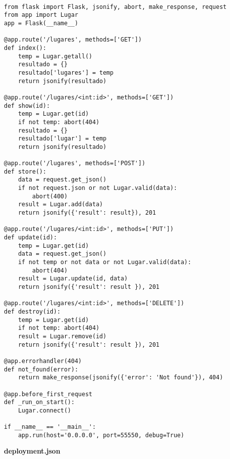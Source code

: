 \begin{mdframed}[linecolor=black, topline=true, bottomline=true,
  leftline=false, rightline=false, backgroundcolor=LightGray,userdefinedwidth=\textwidth]
  \begin{verbatim}

from flask import Flask, jsonify, abort, make_response, request
from app import Lugar
app = Flask(__name__)

@app.route('/lugares', methods=['GET'])
def index():
    temp = Lugar.getall()
    resultado = {}
    resultado['lugares'] = temp
    return jsonify(resultado)

@app.route('/lugares/<int:id>', methods=['GET'])
def show(id):
    temp = Lugar.get(id)
    if not temp: abort(404)
    resultado = {}
    resultado['lugar'] = temp
    return jsonify(resultado)

@app.route('/lugares', methods=['POST'])
def store():
    data = request.get_json()
    if not request.json or not Lugar.valid(data):
        abort(400)
    result = Lugar.add(data)
    return jsonify({'result': result}), 201

@app.route('/lugares/<int:id>', methods=['PUT'])
def update(id):
    temp = Lugar.get(id)
    data = request.get_json()
    if not temp or not data or not Lugar.valid(data):
        abort(404)
    result = Lugar.update(id, data)
    return jsonify({'result': result }), 201

@app.route('/lugares/<int:id>', methods=['DELETE'])
def destroy(id):
    temp = Lugar.get(id)
    if not temp: abort(404)
    result = Lugar.remove(id)
    return jsonify({'result': result }), 201

@app.errorhandler(404)
def not_found(error):
    return make_response(jsonify({'error': 'Not found'}), 404)

@app.before_first_request
def _run_on_start():
    Lugar.connect()

if __name__ == '__main__':
    app.run(host='0.0.0.0', port=55550, debug=True)

\end{verbatim}
\end{mdframed}
\pagebreak
{ \sffamily \textbf{deployment.json} }
